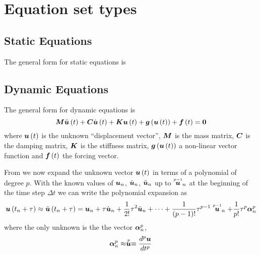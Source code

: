 \section{Equation set types}

\subsection{Static Equations}

The general form for static equations is

\subsection{Dynamic Equations}

The general form for dynamic equations is
\begin{equation}
  \matr{M}\fnof{\ddot{\vect{u}}}{t}+\matr{C}\fnof{\dot{\vect{u}}}{t}+\matr{K}\fnof{\vect{u}}{t}+
  \fnof{\vect{g}}{\fnof{\vect{u}}{t}}+\fnof{\vect{f}}{t}=\vect{0}
  \label{eqn:generaldynamicnonlinear}
\end{equation}
where $\fnof{\vect{u}}{t}$ is the unknown ``displacement vector'', $\matr{M}$
is the mass matrix, $\matr{C}$ is the damping matrix, $\matr{K}$ is the
stiffness matrix, $\fnof{\vect{g}}{\fnof{\vect{u}}{t}}$ a non-linear vector
function and $\fnof{\vect{f}}{t}$ the forcing vector.

From \cite{zienkiewicz:2006_1} we now expand the unknown vector $\fnof{\vect{u}}{t}$ in terms of a polynomial of degree
$p$. With the known values of $\vect{u}_{n}$, $\dot{\vect{u}}_{n}$,
$\ddot{\vect{u}}_{n}$ up to $\symover{p-1}{\vect{u}}_{n}$ at the beginning of
the time step $\Delta t$ we can write the polynomial expansion as
\begin{equation}
  \fnof{\vect{u}}{t_{n}+\tau}\approx\fnof{\tilde{\vect{u}}}{t_{n}+\tau}=\vect{u}_{n}+\tau\dot{\vect{u}}_{n}+
  \frac{1}{2!}\tau^{2}\ddot{\vect{u}}_{n}+\cdots+\dfrac{1}{\factorial{p-1}}\tau^{p-1}\symover{p-1}{\vect{u}}_{n}+
  \dfrac{1}{p!}\tau^{p}\vect{\alpha}^{p}_{n}
  \label{eqn:timepolyexpansion}
\end{equation}
where the only unknown is the the vector $\vect{\alpha}^{p}_{n}$,
\begin{equation}
  \vect{\alpha}^{p}_{n}\approx\symover{p}{\vect{u}}\equiv\dnby{p}{\vect{u}}{t}
\end{equation}

